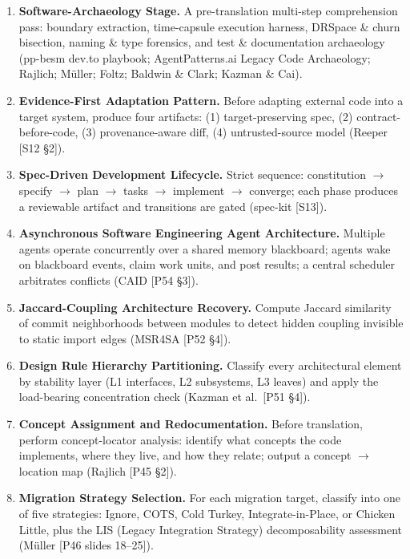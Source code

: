 \begin{enumerate}
\item \textbf{Software-Archaeology Stage.}
A pre-translation multi-step comprehension pass: boundary extraction, time-capsule execution harness, DRSpace \& churn bisection, naming \& type forensics, and test \& documentation archaeology (pp-besm dev.to playbook; AgentPatterns.ai Legacy Code Archaeology; Rajlich; M\"uller; Foltz; Baldwin \& Clark; Kazman \& Cai).

\item \textbf{Evidence-First Adaptation Pattern.}
Before adapting external code into a target system, produce four artifacts: (1) target-preserving spec, (2) contract-before-code, (3) provenance-aware diff, (4) untrusted-source model (Reeper [S12 \S2]).

\item \textbf{Spec-Driven Development Lifecycle.}
Strict sequence: constitution $\rightarrow$ specify $\rightarrow$ plan $\rightarrow$ tasks $\rightarrow$ implement $\rightarrow$ converge; each phase produces a reviewable artifact and transitions are gated (spec-kit [S13]).

\item \textbf{Asynchronous Software Engineering Agent Architecture.}
Multiple agents operate concurrently over a shared memory blackboard; agents wake on blackboard events, claim work units, and post results; a central scheduler arbitrates conflicts (CAID [P54 \S3]).

\item \textbf{Jaccard-Coupling Architecture Recovery.}
Compute Jaccard similarity of commit neighborhoods between modules to detect hidden coupling invisible to static import edges (MSR4SA [P52 \S4]).

\item \textbf{Design Rule Hierarchy Partitioning.}
Classify every architectural element by stability layer (L1 interfaces, L2 subsystems, L3 leaves) and apply the load-bearing concentration check (Kazman et al.\ [P51 \S4]).

\item \textbf{Concept Assignment and Redocumentation.}
Before translation, perform concept-locator analysis: identify what concepts the code implements, where they live, and how they relate; output a concept $\rightarrow$ location map (Rajlich [P45 \S2]).

\item \textbf{Migration Strategy Selection.}
For each migration target, classify into one of five strategies: Ignore, COTS, Cold Turkey, Integrate-in-Place, or Chicken Little, plus the LIS (Legacy Integration Strategy) decomposability assessment (M\"uller [P46 slides 18--25]).


\end{enumerate}
